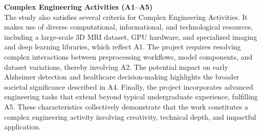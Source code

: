 \textbf{Complex Engineering Activities (A1–A5)}\\
The study also satisfies several criteria for Complex Engineering Activities. It makes use of diverse computational, informational, and technological resources, including a large-scale 3D MRI dataset, GPU hardware, and specialized imaging and deep learning libraries, which reflect A1. The project requires resolving complex interactions between preprocessing workflows, model components, and dataset variations, thereby involving A2. The potential impact on early Alzheimer detection and healthcare decision-making highlights the broader societal significance described in A4. Finally, the project incorporates advanced engineering tasks that extend beyond typical undergraduate experience, fulfilling A5. These characteristics collectively demonstrate that the work constitutes a complex engineering activity involving creativity, technical depth, and impactful application.















